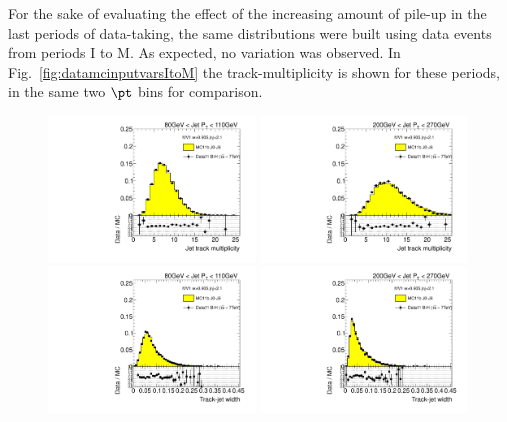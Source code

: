  For the sake of evaluating the effect of the increasing amount of pile-up in the last periods of data-taking, %
the same distributions were built using data events from periods I to M. As expected, no variation was observed. In Fig.~\ref{fig:datamcinputvarsItoM} the track-multiplicity is shown for these periods, in the same two $\pt$ bins for comparison.  

\begin{figure}[tp]
\centering
\includegraphics[width=0.49\textwidth]{FIGS/dataMC/VarNtrkPT080.pdf}
\includegraphics[width=0.49\textwidth]{FIGS/dataMC/VarNtrkPT200.pdf}
\includegraphics[width=0.49\textwidth]{FIGS/dataMC/VarTrkWidthPT080.pdf}
\includegraphics[width=0.49\textwidth]{FIGS/dataMC/VarTrkWidthPT200.pdf}  

\end{figure}
